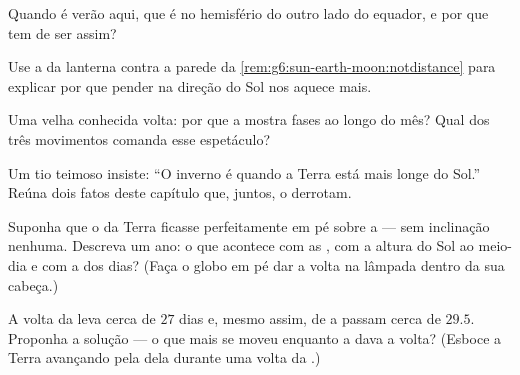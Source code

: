 \begin{exercise}[$\star$]\label{exo:g6:sun-earth-moon:6}
Quando é verão aqui, que  é no hemisfério do outro lado do
equador, e por que tem de ser assim?
\end{exercise}

\begin{exercise}[$\star$]\label{exo:g6:sun-earth-moon:7}
Use a  da lanterna contra a parede da
\cref{rem:g6:sun-earth-moon:notdistance} para explicar por que
pender na direção do Sol nos aquece mais.
\end{exercise}

\begin{exercise}[$\star$]\label{exo:g6:sun-earth-moon:8}
Uma velha conhecida volta: por que a  mostra fases ao longo do
mês? Qual dos três movimentos comanda esse espetáculo?
\end{exercise}

\begin{exercise}[$\star\star$]\label{exo:g6:sun-earth-moon:9}
Um tio teimoso insiste: ``O inverno é quando a Terra está mais longe
do Sol.'' Reúna dois fatos deste capítulo que, juntos, o derrotam.
\end{exercise}

\begin{exercise}[$\star\star$]\label{exo:g6:sun-earth-moon:10}
Suponha que o  da Terra ficasse perfeitamente em pé sobre a
 --- sem inclinação nenhuma. Descreva um ano: o que acontece
com as , com a altura do Sol ao meio-dia e com a  dos
dias? (Faça o globo em pé dar a volta na lâmpada dentro da sua
cabeça.)
\end{exercise}

\begin{exercise}[$\star\star$]\label{exo:g6:sun-earth-moon:11}
A volta da  leva cerca de $27$ dias e, mesmo assim, de  a
 passam cerca de $29.5$. Proponha a solução --- o que mais
se moveu enquanto a  dava a volta? (Esboce a Terra avançando pela
 dela durante uma volta da .)
\end{exercise}

